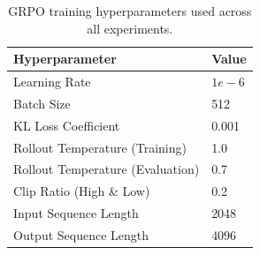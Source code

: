 \begin{table}[H]
\centering
\begin{tabular}{ll}
\toprule
\textbf{Hyperparameter} & \textbf{Value} \\
\midrule
Learning Rate & $1e-6$ \\
Batch Size & 512 \\
KL Loss Coefficient & 0.001 \\
Rollout Temperature (Training) & 1.0 \\
Rollout Temperature (Evaluation) & 0.7 \\
Clip Ratio (High \& Low) & 0.2 \\
Input Sequence Length & 2048 \\
Output Sequence Length & 4096 \\
\bottomrule
\end{tabular}
\caption{GRPO training hyperparameters used across all experiments.}
\label{tab:hyperparams_appendix}
\end{table}

